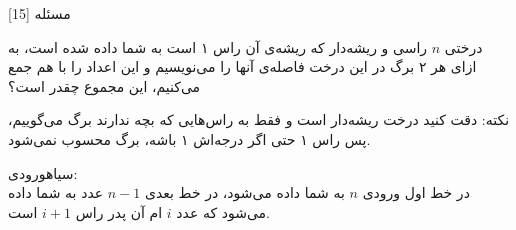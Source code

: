 ‌مسئله [15]


% 
%
%
% 

درختی 
$n$
راسی و ریشه‌دار که ریشه‌ی آن راس ۱ است به شما داده شده است،
به ازای هر ۲ برگ در این درخت فاصله‌ی آنها را می‌نویسیم و این اعداد را با هم جمع می‌کنیم، این مجموع چقدر است؟

نکته:
دقت کنید درخت ریشه‌دار است و فقط به راس‌هایی که بچه ندارند برگ می‌گوییم، پس راس ۱ حتی اگر درجه‌اش ۱ باشه، برگ محسوب نمی‌شود.


\noindent
{}‌سیاه{ورودی:}\\
در خط اول ورودی 
$n$
به شما داده می‌شود،
در خط بعدی 
$n-1$
عدد به شما داده می‌شود که عدد 
$i$
ام آن 
پدر راس 
$i+1$
است.

